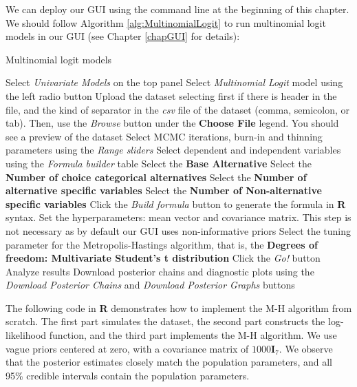We can deploy our GUI using the command line at the beginning of this chapter. We should follow Algorithm \ref{alg:MultinomialLogit} to run multinomial logit models in our GUI (see Chapter \ref{chapGUI} for details):

\begin{algorithm}[h!]
	\caption{Multinomial logit models}\label{alg:MultinomialLogit}
	\begin{algorithmic}[1]  		 			
		\State Select \textit{Univariate Models} on the top panel
		\State Select \textit{Multinomial Logit} model using the left radio button
		\State Upload the dataset selecting first if there is header in the file, and the kind of separator in the \textit{csv} file of the dataset (comma, semicolon, or tab). Then, use the \textit{Browse} button under the \textbf{Choose File} legend. You should see a preview of the dataset
		\State Select MCMC iterations, burn-in and thinning parameters using the \textit{Range sliders}
		\State Select dependent and independent variables using the \textit{Formula builder} table
		\State Select the \textbf{Base Alternative}
		\State Select the \textbf{Number of choice categorical alternatives}
		\State Select the \textbf{Number of alternative specific variables}
		\State Select the \textbf{Number of Non-alternative specific variables} 
		\State Click the \textit{Build formula} button to generate the formula in \textbf{R} syntax.
		\State Set the hyperparameters: mean vector and covariance matrix. This step is not necessary as by default our GUI uses non-informative priors
		\State Select the tuning parameter for the Metropolis-Hastings algorithm, that is, the \textbf{Degrees of freedom: Multivariate Student's t distribution} 
		\State Click the \textit{Go!} button
		\State Analyze results
		\State Download posterior chains and diagnostic plots using the \textit{Download Posterior Chains} and \textit{Download Posterior Graphs} buttons
	\end{algorithmic} 
\end{algorithm}

The following code in \textbf{R} demonstrates how to implement the M-H algorithm from scratch. The first part simulates the dataset, the second part constructs the log-likelihood function, and the third part implements the M-H algorithm. We use vague priors centered at zero, with a covariance matrix of $1000\bm{I}_7$. We observe that the posterior estimates closely match the population parameters, and all 95\% credible intervals contain the population parameters.

